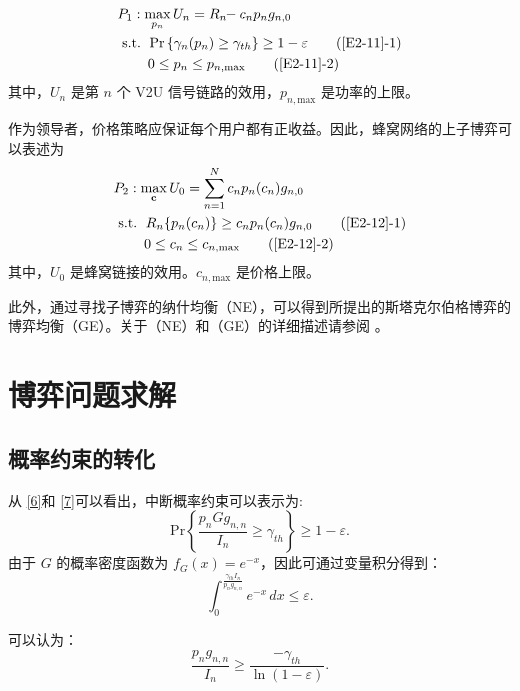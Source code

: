 \begin{align}
&P_1: \max\limits_{p_{n}} U_{n}=R_{n}\!\!-c_{n} p_n g_{n,0}                \label{E2-11}\\
&\text { s.t. }
\quad \!\!\!\!\! \textrm{Pr}\left\{\gamma_{n}(p_n) \geq \gamma_{th}\right\}\geq1-\varepsilon  \tag{\ref{E2-11}{-1}}  \label{E2-11-1}\\
& \quad \quad \quad \!\!\!\!\! 0\leq p_n\leq p_{n,\textrm{max}}                               \tag{\ref{E2-11}{-2}}  \label{E2-11-2}
\end{align}
其中，$U_{n}$ 是第 $n$ 个 V2U 信号链路的效用，$p_{n,\textrm{max}}$ 是功率的上限。

作为领导者，价格策略应保证每个用户都有正收益。因此，蜂窝网络的上子博弈可以表述为
\begin{align}
&P_2: \max\limits_{\mathbf{c}} U_0=\sum\limits_{n=1}^N c_{n} p_n(c_{n}) g_{n,0}                    \label{E2-12}\\
& \text { s.t. }
\quad \!\!\!\!\! R_{n}\{p_n(c_{n})\} \geq c_{n} p_n(c_{n}) g_{n,0}          \tag{\ref{E2-12}{-1}}  \label{E2-12-1}\\  %
& \quad \quad \quad \!\!\!\!\! 0\leq c_n\leq c_{n,\textrm{max}}             \tag{\ref{E2-12}{-2}}  \label{E2-12-2}  %
\end{align}
其中，$U_{0}$ 是蜂窝链接的效用。$c_{n,\textrm{max}}$ 是价格上限。

此外，通过寻找子博弈的纳什均衡（NE），可以得到所提出的斯塔克尔伯格博弈的博弈均衡（GE）。关于（NE）和（GE）的详细描述请参阅 \cite{RAI}。
\section{博弈问题求解}\label{section2-3}
\subsection{概率约束的转化}\label{section2-3-1}
从 \eqref{6}和 \eqref{7}可以看出，中断概率约束可以表示为:
\begin{equation}\label{E13}
\textrm{Pr}\left\{\frac{p_{n}G g_{n,n}}{I_n} \geq \gamma_{th}\right\}\geq1-\varepsilon.
\end{equation}
由于 $G$ 的概率密度函数为 $f_G (x)=e^{-x}$，因此可通过变量积分得到：
\begin{equation}\label{E14}
\int_{0}^{\frac{\gamma_{th}I_{n}}{p_n g_{n,n}}} e^{-x}\, dx\leq\varepsilon.
\end{equation}

可以认为：
\begin{equation}\label{15}
\frac{p_n g_{ n,n}}{I_{n}}\geq\frac{-\gamma_{th}}{\ln(1-\varepsilon)}.
\end{equation}

